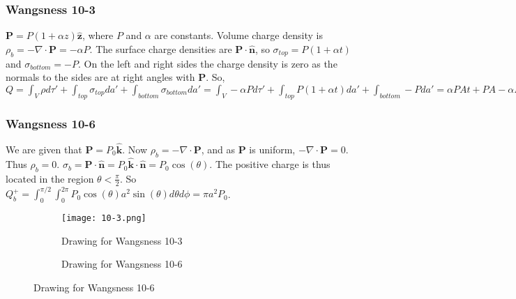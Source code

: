             \subsubsection{Wangsness 10-3}
            $\mathbf{P}= P(1+\alpha z)\hat{\mathbf{z}}$, where $P$ and $\alpha$ are constants. Volume charge density is $\rho_{b} = -\nabla \cdot \mathbf{P} = -\alpha P$. The surface charge densities are $\mathbf{P}\cdot \hat{\mathbf{n}}$, so $\sigma_{top} = P(1+\alpha t)$ and $\sigma_{bottom} = -P$. On the left and right sides the charge density is zero as the normals to the sides are at right angles with $\mathbf{P}$. So, $Q = \int_{V} \rho d\tau' + \int_{top} \sigma_{top} da' + \int_{bottom} \sigma_{bottom} da' = \int_{V}-\alpha P d\tau' + \int_{top}P(1+\alpha t) da' + \int_{bottom} - Pda' = \alpha PAt + PA - \alpha PA t - PA = 0$
            \subsubsection{Wangsness 10-6}
            We are given that $\mathbf{P} = P_0 \hat{\mathbf{k}}$. Now $\rho_{b} = -\nabla \cdot \mathbf{P}$, and as $\mathbf{P}$ is uniform, $-\nabla \cdot \mathbf{P} = 0$. Thus $\rho_b = 0$. $\sigma_b = \mathbf{P}\cdot \hat{\mathbf{n}} = P_0 \hat{\mathbf{k}} \cdot \hat{\mathbf{n}} = P_0 \cos(\theta)$. The positive charge is thus located in the region $\theta < \frac{\pi}{2}$. So $Q_b^+ = \int_{0}^{\pi/2}\int_{0}^{2\pi} P_0 \cos(\theta) a^2 \sin(\theta) d\theta d\phi = \pi a^2 P_0$.
            \begin{figure}[htbp]
                \centering
                \begin{subfigure}[b]{0.49\textwidth}
                    \centering
                    \captionsetup{type=figure}
                    \texttt{[image: 10-3.png]}
                    \caption{Drawing for Wangsness 10-3}
                \end{subfigure}
                \begin{subfigure}[b]{0.49\textwidth}
                    \centering
                    \captionsetup{type=figure}
                    
                    \caption{Drawing for Wangsness 10-6}
                \end{subfigure}
            \end{figure}
